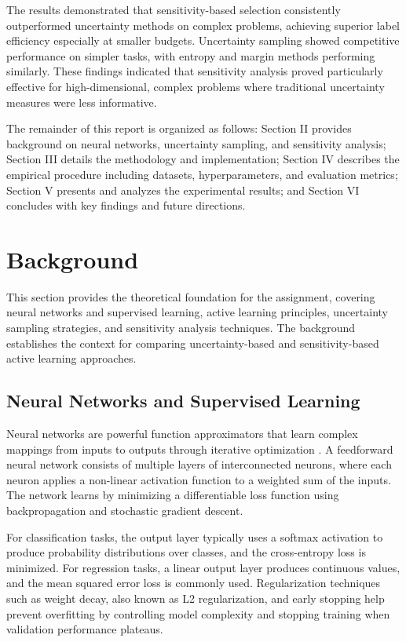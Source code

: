 \documentclass[conference]{IEEEtran}
\begin{document}
The results demonstrated that sensitivity-based selection consistently outperformed uncertainty methods on complex problems, achieving superior label efficiency especially at smaller budgets. Uncertainty sampling showed competitive performance on simpler tasks, with entropy and margin methods performing similarly. These findings indicated that sensitivity analysis proved particularly effective for high-dimensional, complex problems where traditional uncertainty measures were less informative.

The remainder of this report is organized as follows: Section II provides background on neural networks, uncertainty sampling, and sensitivity analysis; Section III details the methodology and implementation; Section IV describes the empirical procedure including datasets, hyperparameters, and evaluation metrics; Section V presents and analyzes the experimental results; and Section VI concludes with key findings and future directions.

\section{Background}

This section provides the theoretical foundation for the assignment, covering neural networks and supervised learning, active learning principles, uncertainty sampling strategies, and sensitivity analysis techniques. The background establishes the context for comparing uncertainty-based and sensitivity-based active learning approaches.

\subsection{Neural Networks and Supervised Learning}

Neural networks are powerful function approximators that learn complex mappings from inputs to outputs through iterative optimization \cite{gal2017deep}. A feedforward neural network consists of multiple layers of interconnected neurons, where each neuron applies a non-linear activation function to a weighted sum of the inputs. The network learns by minimizing a differentiable loss function using backpropagation and stochastic gradient descent.

For classification tasks, the output layer typically uses a softmax activation to produce probability distributions over classes, and the cross-entropy loss is minimized. For regression tasks, a linear output layer produces continuous values, and the mean squared error loss is commonly used. Regularization techniques such as weight decay, also known as L2 regularization, and early stopping help prevent overfitting by controlling model complexity and stopping training when validation performance plateaus.
\end{document}
